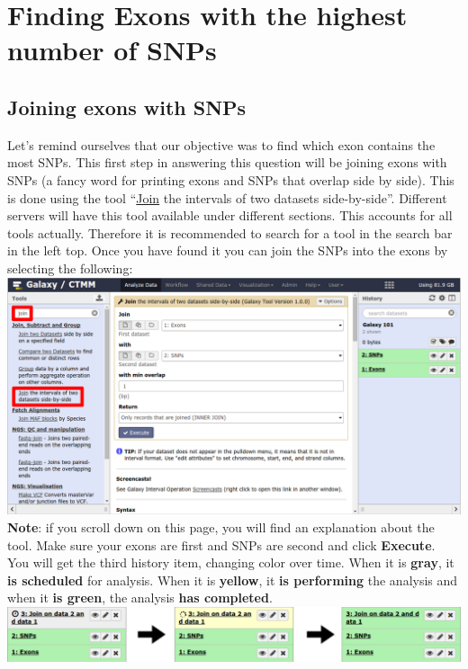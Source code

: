 \documentclass[11pt,a4paper]{article}
\begin{document}

\section{Finding Exons with the highest number of SNPs}
\subsection{Joining exons with SNPs}
Let's remind ourselves that our objective was to find which exon contains the most SNPs. This first step in answering this question will be joining exons with SNPs (a fancy word for printing exons and SNPs that overlap side by side). This is done using the tool ``\underline{Join} the intervals of two datasets side-by-side''.
Different servers will have this tool available under different sections. This accounts for all tools actually. Therefore it is recommended to search for a tool in the search bar in the left top. Once you have found it you can join the SNPs into the exons by selecting the following:\\
\includegraphics[width=\textwidth]{figures/101_11}\\
\textbf{Note}: if you scroll down on this page, you will find an explanation about the tool. Make sure your exons are first and SNPs are second and click \textbf{Execute}. You will get the third history item, changing color over time. When it is \textbf{gray}, it \textbf{is scheduled} for analysis. When it is \textbf{yellow}, it \textbf{is performing} the analysis and when it \textbf{is green}, the analysis \textbf{has completed}. \\
\includegraphics[width=\textwidth]{figures/101_12}\\
\end{document}
